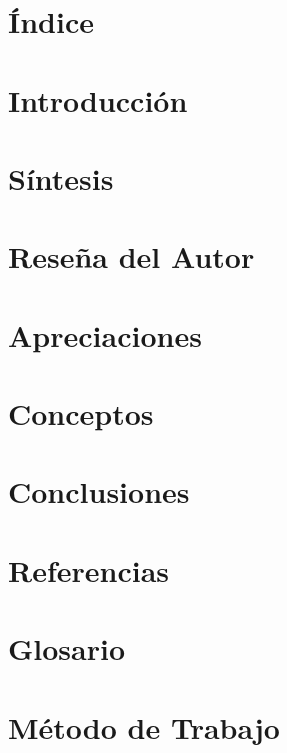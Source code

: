 \documentclass[11pt,letterpaper]{article}
\begin{document}


\section*{\'Indice}
\label{sec:indice}


\section*{Introducci\'on}
\label{sec:introduccion}


\section*{S\'intesis}
\label{sec:sintesis}



\section*{Rese\~na del Autor}
\label{sec:autor}


\section*{Apreciaciones}
\label{sec:apreciaciones}


\section*{Conceptos}
\label{sec:conceptos}



\section*{Conclusiones}
\label{sec:conclusiones}


\section*{Referencias}
\label{sec:referencias}


\section*{Glosario}
\label{sec:glosario}


\section*{M\'etodo de Trabajo}
\label{sec:metodo}

\end{document}
